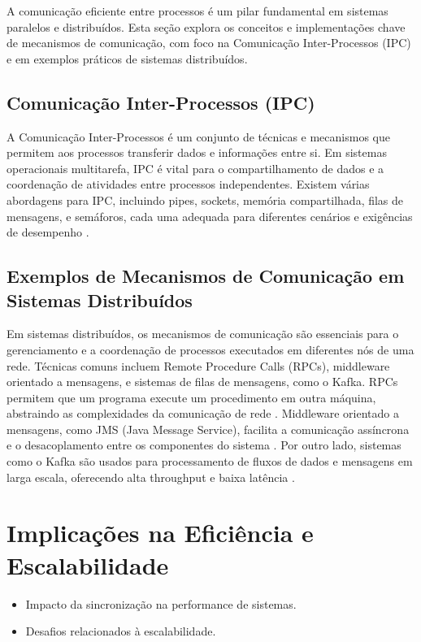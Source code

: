 \documentclass[conference]{IEEEtran}
\begin{document}
A comunicação eficiente entre processos é um pilar fundamental em sistemas paralelos e distribuídos. Esta seção explora os conceitos e implementações chave de mecanismos de comunicação, com foco na Comunicação Inter-Processos (IPC) e em exemplos práticos de sistemas distribuídos.

\subsection{Comunicação Inter-Processos (IPC)}
A Comunicação Inter-Processos é um conjunto de técnicas e mecanismos que permitem aos processos transferir dados e informações entre si. Em sistemas operacionais multitarefa, IPC é vital para o compartilhamento de dados e a coordenação de atividades entre processos independentes. Existem várias abordagens para IPC, incluindo pipes, sockets, memória compartilhada, filas de mensagens, e semáforos, cada uma adequada para diferentes cenários e exigências de desempenho \cite{tanenbaum2007modernos}.

\subsection{Exemplos de Mecanismos de Comunicação em Sistemas Distribuídos}
Em sistemas distribuídos, os mecanismos de comunicação são essenciais para o gerenciamento e a coordenação de processos executados em diferentes nós de uma rede. Técnicas comuns incluem Remote Procedure Calls (RPCs), middleware orientado a mensagens, e sistemas de filas de mensagens, como o Kafka. RPCs permitem que um programa execute um procedimento em outra máquina, abstraindo as complexidades da comunicação de rede \cite{birrell1984rpc}. Middleware orientado a mensagens, como JMS (Java Message Service), facilita a comunicação assíncrona e o desacoplamento entre os componentes do sistema \cite{hohpe2004enterprise}. Por outro lado, sistemas como o Kafka são usados para processamento de fluxos de dados e mensagens em larga escala, oferecendo alta throughput e baixa latência \cite{kreps2011kafka}.

\section{Implicações na Eficiência e Escalabilidade}
\begin{itemize}
    \item Impacto da sincronização na performance de sistemas.
    \item Desafios relacionados à escalabilidade.
\end{itemize}
\end{document}
